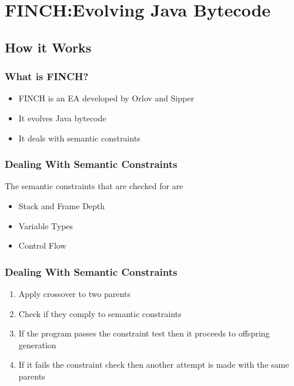\documentclass{beamer}
\begin{document}
\section[FINCH]{FINCH:Evolving Java Bytecode}

\subsection[How it works]{How it Works}
\begin{frame}
	\frametitle{What is FINCH?}
	\begin{itemize}
		\item FINCH is an EA developed by Orlov and Sipper	
		\item It evolves Java bytecode
		\item It deals with semantic constraints
	\end{itemize}
\end{frame}

\begin{frame}
  \frametitle{Dealing With Semantic Constraints}
The semantic constraints that are checked for are

	\begin{itemize}
	\item Stack and Frame Depth
	\item Variable Types
	\item Control Flow
	\end{itemize}

\end{frame}

\begin{frame}
\frametitle{Dealing With Semantic Constraints}
\begin{enumerate}
\item Apply crossover to two parents
\item Check if they comply to semantic constraints
\item If the program passes the constraint test then it proceeds to offspring generation
\item If it fails the constraint check then another attempt is made with the same parents
\end{enumerate}

\end{frame}
\end{document}
